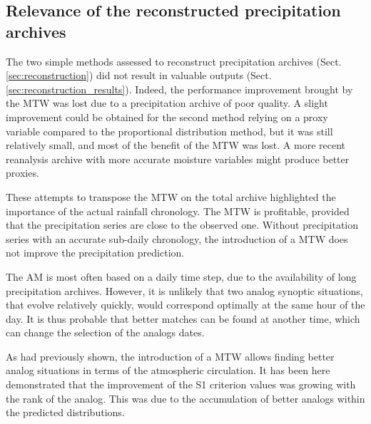 \documentclass[hess, manuscript]{copernicus}
\begin{document}


\subsection{Relevance of the reconstructed precipitation archives}

The two simple methods assessed to reconstruct precipitation archives (Sect. \ref{sec:reconstruction}) did not result in valuable outputs (Sect. \ref{sec:reconstruction_results}). Indeed, the performance improvement brought by the MTW was lost due to a precipitation archive of poor quality. A slight improvement could be obtained for the second method relying on a proxy variable compared to the proportional distribution method, but it was still relatively small, and most of the benefit of the MTW was lost. A more recent reanalysis archive with more accurate moisture variables might produce better proxies.

These attempts to transpose the MTW on the total archive highlighted the importance of the actual rainfall chronology. The MTW is profitable, provided that the precipitation series are close to the observed one. Without precipitation series with an accurate sub-daily chronology, the introduction of a MTW does not improve the precipitation prediction.



\conclusions  %

The AM is most often based on a daily time step, due to the availability of long precipitation archives. However, it is unlikely that two analog synoptic situations, that evolve relatively quickly, would correspond optimally at the same hour of the day. It is thus probable that better matches can be found at another time, which can change the selection of the analogs dates.

As \citet{Finet2008} had previously shown, the introduction of a MTW allows finding better analog situations in terms of the atmospheric circulation. It has been here demonstrated that the improvement of the S1 criterion values was growing with the rank of the analog. This was due to the accumulation of better analogs within the predicted distributions.
\end{document}
